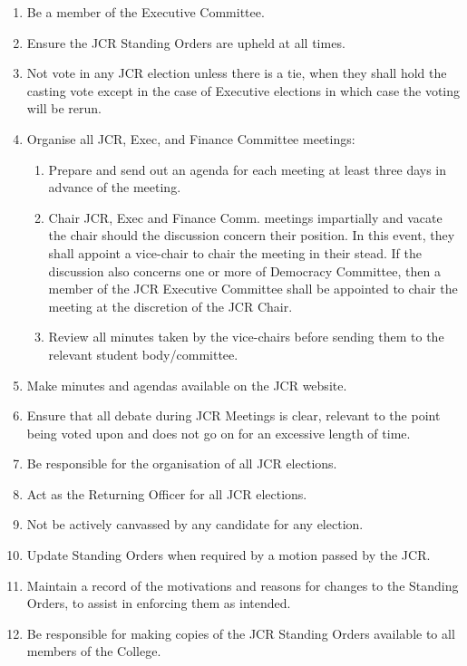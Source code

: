 \label{sc:Chair}
\begin{enumerate}
    \item Be a member of the Executive Committee.
    \item Ensure the JCR Standing Orders are upheld at all times.
    \item Not vote in any JCR election unless there is a tie, when they shall hold the casting vote except in the case of Executive elections in which case the voting will be rerun.
    \item Organise all JCR, Exec, and Finance Committee meetings:
        \begin{enumerate}
            \item Prepare and send out an agenda for each meeting at least three days in advance of the meeting.
            \item Chair JCR, Exec and Finance Comm. meetings impartially and vacate the chair should the discussion concern their position. In this event, they shall appoint a vice-chair to chair the meeting in their stead. If the discussion also concerns one or more of Democracy Committee, then a member of the JCR Executive Committee shall be appointed to chair the meeting at the discretion of the JCR Chair.
            \item Review all minutes taken by the vice-chairs before sending them to the relevant student body/committee.
        \end{enumerate}
    \item Make minutes and agendas available on the JCR website. 
    \item Ensure that all debate during JCR Meetings is clear, relevant to the point being voted upon and does not go on for an excessive length of time. 
    \item Be responsible for the organisation of all JCR elections.
    \item Act as the Returning Officer for all JCR elections.
    \item Not be actively canvassed by any candidate for any election.
    \item Update Standing Orders when required by a motion passed by the JCR.
    \item Maintain a record of the motivations and reasons for changes to the Standing Orders, to assist in enforcing them as intended.
    \item Be responsible for making copies of the JCR Standing Orders available to all members of the College. 

\end{enumerate}
